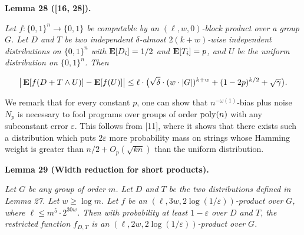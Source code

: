 \documentclass[10pt,a4paper]{article}
\begin{document}


\par\medskip\noindent\textbf{
\textbf{Lemma 28}\textbf{ }([16, 28])\textbf{.}
}\par



\emph{Let $f\colon\{0,1\}^{n}\to\{0,1\}$ be computable by an $(\ell,w,0)$-block product over a group $G$.
Let $D$ and $T$ be two independent $\delta$-almost $2(k+w)$-wise independent distributions on $\{0,1\}^{n}$ with $\mathop{\bf E\/}[D_{i}]=1/2$ and $\mathop{\bf E\/}[T_{i}]=p$,
and $U$ be the uniform distribution on $\{0,1\}^{n}$.
Then}\par


\[\begin{gathered}
\big{\lvert}\mathop{\bf E\/}[f(D+T\wedge U)]-\mathop{\bf E\/}[f(U)]\big{\rvert}\leq\ell\cdot\bigl{(}\sqrt{\delta}\cdot(w\cdot\lvert G\rvert)^{k+w}+(1-2p)^{k/2}+\sqrt{\gamma}\bigr{)}.
\end{gathered}\]






We remark that for every constant $p$, one can show that $n^{-\omega(1)}$-bias plus noise $N_{p}$ is necessary to fool programs over groups of order $\textnormal{poly}(n)$ with any subconstant error $\varepsilon$.
This follows from [11], where it shows that there exists such a distribution which puts $2\varepsilon$ more probability mass on strings whose Hamming weight is greater than $n/2+O_{p}(\sqrt{kn})$ than the uniform distribution.\par





\par\medskip\noindent\textbf{
\textbf{Lemma 29}\textbf{ }(Width reduction for short products)\textbf{.}
}\par



\emph{Let $G$ be any group of order $m$.
Let $D$ and $T$ be the two distributions defined in Lemma 27.
Let $w\geq\log m$.
Let $f$ be an $(\ell,3w,2\log(1/\varepsilon))$-product over $G$, where $\ell\leq m^{5}\cdot 2^{30w}$.
Then with probability at least $1-\varepsilon$ over $D$ and $T$, the restricted function $f_{D,T}$ is an $(\ell,2w,2\log(1/\varepsilon))$-product over $G$.}\par
\end{document}
